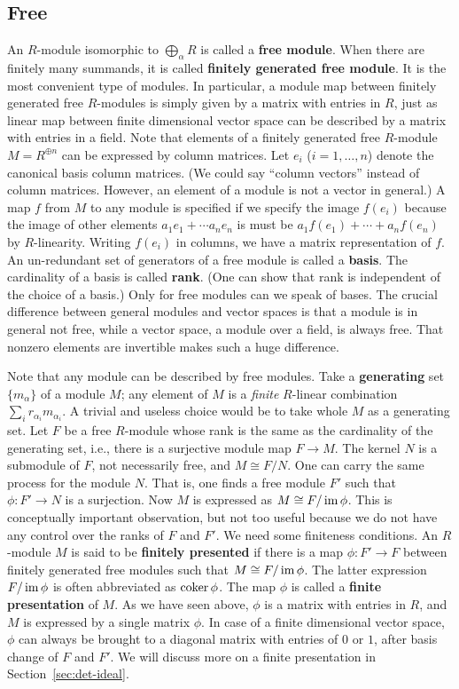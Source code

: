 \subsection*{Free}

An $R$-module isomorphic to $\bigoplus_\alpha R$ is called a {\bf free module}.
When there are finitely many summands, it is called {\bf finitely generated free module}.
It is the most convenient type of modules.
In particular, a module map between finitely generated free $R$-modules
is simply given by a matrix with entries in $R$, just as linear map between finite dimensional vector space
can be described by a matrix with entries in a field.
Note that elements of a finitely generated free $R$-module $M = R^{\oplus n}$ can be expressed by column matrices.
Let $e_i$ ($i=1,\ldots,n$) denote the canonical basis column matrices.
(We could say ``column vectors'' instead of column matrices. However, an element of a module is not a vector in general.)
A map $f$ from $M$ to any module is specified if we specify the image $f(e_i)$
because the image of other elements $a_1 e_1 + \cdots a_n e_n$ is must be $a_1 f(e_1) + \cdots + a_n f(e_n)$
by $R$-linearity.
Writing $f(e_i)$ in columns, we have a matrix representation of $f$.
An un-redundant set of generators of a free module is called a {\bf basis}.
The cardinality of a basis is called {\bf rank}.
(One can show that rank is independent of the choice of a basis.)
Only for free modules can we speak of bases.
The crucial difference between general modules and vector spaces is that
a module is in general not free, while a vector space, a module over a field, is always free.
That nonzero elements are invertible makes such a huge difference.


Note that any module can be described by free modules.
Take a {\bf generating} set $\{ m_\alpha \}$ of a module $M$; 
any element of $M$ is a {\em finite} $R$-linear combination $\sum_i r_{\alpha_i} m_{\alpha_i}$.
A trivial and useless choice would be to take whole $M$ as a generating set.
Let $F$ be a free $R$-module whose rank is the same as the cardinality of the generating set,
i.e., there is a surjective module map $F \to M$.
The kernel $N$ is a submodule of $F$, not necessarily free, and $M \cong F / N$.
One can carry the same process for the module $N$.
That is, one finds a free module $F'$ such that $\phi : F' \to N$ is a surjection.
Now $M$ is expressed as $M \cong F / \mathop{\mathrm{im}}\nolimits \phi$.
This is conceptually important observation, but not too useful
because we do not have any control over the ranks of $F$ and $F'$.
We need some finiteness conditions.
An $R$-module $M$ is said to be {\bf finitely presented} 
if there is a map $\phi : F' \to F$ between finitely generated free modules
such that $M \cong F / \mathop{\mathrm{im}}\nolimits \phi$. The latter expression $F/\mathop{\mathrm{im}}\nolimits \phi$ is often abbreviated as $\mathop{\mathrm{coker}}\nolimits \phi$.
The map $\phi$ is called a {\bf finite presentation} of $M$.
As we have seen above, $\phi$ is a matrix with entries in $R$,	
and $M$ is expressed by a single matrix $\phi$.
In case of a finite dimensional vector space, $\phi$ can always be brought to a diagonal matrix
with entries of $0$ or $1$, after basis change of $F$ and $F'$.
We will discuss more on a finite presentation in Section~\ref{sec:det-ideal}.


